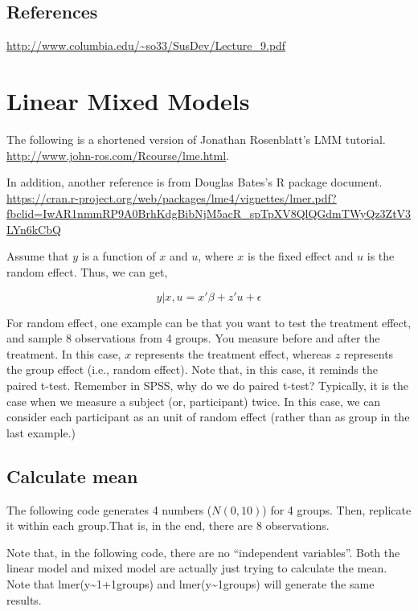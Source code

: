 \documentclass[]{book}
\begin{document}
\section{References}\label{references}

\url{http://www.columbia.edu/~so33/SusDev/Lecture_9.pdf}

\chapter{Linear Mixed Models}\label{linear-mixed-models}

The following is a shortened version of Jonathan Rosenblatt's LMM
tutorial. \url{http://www.john-ros.com/Rcourse/lme.html}.

In addition, another reference is from Douglas Bates's R package
document.
\url{https://cran.r-project.org/web/packages/lme4/vignettes/lmer.pdf?fbclid=IwAR1nmmRP9A0BrhKdgBibNjM5acR_spTpXV8QlQGdmTWyQz3ZtV3LYn6kCbQ}

Assume that \(y\) is a function of \(x\) and \(u\), where \(x\) is the
fixed effect and \(u\) is the random effect. Thus, we can get,

\[y|x, u = x'\beta+z'u+\epsilon\]

For random effect, one example can be that you want to test the
treatment effect, and sample 8 observations from 4 groups. You measure
before and after the treatment. In this case, \(x\) represents the
treatment effect, whereas \(z\) represents the group effect (i.e.,
random effect). Note that, in this case, it reminds the paired t-test.
Remember in SPSS, why do we do paired t-test? Typically, it is the case
when we measure a subject (or, participant) twice. In this case, we can
consider each participant as an unit of random effect (rather than as
group in the last example.)

\section{Calculate mean}\label{calculate-mean}

The following code generates 4 numbers (\(N(0,10)\)) for 4 groups. Then,
replicate it within each group.That is, in the end, there are 8
observations.

Note that, in the following code, there are no ``independent
variables''. Both the linear model and mixed model are actually just
trying to calculate the mean. Note that
lmer(y\textasciitilde{}1+1\textbar{}groups) and
lmer(y\textasciitilde{}1\textbar{}groups) will generate the same
results.
\end{document}
